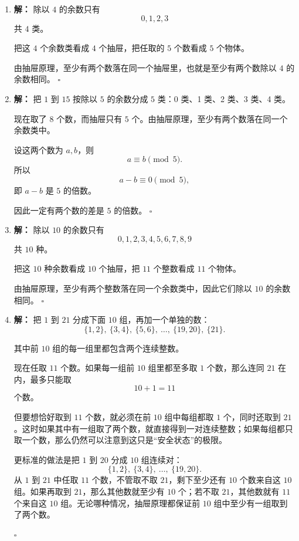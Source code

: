 \documentclass[11pt,a4paper,fontset=fandol]{ctexart}
\theoremstyle{formalexample}
\newenvironment{solution}{\par\noindent\textbf{解：}}{\hfill$\square$\par}
\begin{document}
\begin{enumerate}
  \item \begin{solution}
  除以 $4$ 的余数只有
  \[
  0,1,2,3
  \]
  共 $4$ 类。

  把这 $4$ 个余数类看成 $4$ 个抽屉，把任取的 $5$ 个数看成 $5$ 个物体。

  由抽屉原理，至少有两个数落在同一个抽屉里，也就是至少有两个数除以 $4$ 的余数相同。
  \end{solution}

  \item \begin{solution}
  把 $1$ 到 $15$ 按除以 $5$ 的余数分成 $5$ 类：0 类、1 类、2 类、3 类、4 类。

  现在取了 $8$ 个数，而抽屉只有 $5$ 个。由抽屉原理，至少有两个数落在同一个余数类中。

  设这两个数为 $a,b$，则
  \[
  a\equiv b\pmod 5.
  \]
  所以
  \[
  a-b\equiv 0\pmod 5,
  \]
  即 $a-b$ 是 $5$ 的倍数。

  因此一定有两个数的差是 $5$ 的倍数。
  \end{solution}

  \item \begin{solution}
  除以 $10$ 的余数只有
  \[
  0,1,2,3,4,5,6,7,8,9
  \]
  共 $10$ 种。

  把这 $10$ 种余数看成 $10$ 个抽屉，把 $11$ 个整数看成 $11$ 个物体。

  由抽屉原理，至少有两个整数落在同一个余数类中，因此它们除以 $10$ 的余数相同。
  \end{solution}

  \item \begin{solution}
  把 $1$ 到 $21$ 分成下面 $10$ 组，再加一个单独的数：
  \[
  \{1,2\},\ \{3,4\},\ \{5,6\},\ \ldots,\ \{19,20\},\ \{21\}.
  \]

  其中前 $10$ 组的每一组里都包含两个连续整数。

  现在任取 $11$ 个数。如果每一组前 $10$ 组里都至多取 $1$ 个数，那么连同 $21$ 在内，最多只能取
  \[
  10+1=11
  \]
  个数。

  但要想恰好取到 $11$ 个数，就必须在前 $10$ 组中每组都取 $1$ 个，同时还取到 $21$。这时如果其中有一组取了两个数，就直接得到一对连续整数；如果每组都只取一个数，那么仍然可以注意到这只是“安全状态”的极限。

  更标准的做法是把 $1$ 到 $20$ 分成 $10$ 组连续对：
  \[
  \{1,2\},\ \{3,4\},\ \ldots,\ \{19,20\}.
  \]
  从 $1$ 到 $21$ 中任取 $11$ 个数，不管取不取 $21$，剩下至少还有 $10$ 个数来自这 $10$ 组。如果再取到 $21$，那么其他数就至少有 $10$ 个；若不取 $21$，其他数就有 $11$ 个来自这 $10$ 组。无论哪种情况，抽屉原理都保证前 $10$ 组中至少有一组取到了两个数。


\end{solution}
\end{enumerate}
\end{document}
